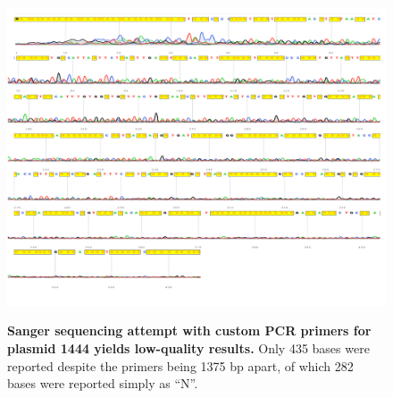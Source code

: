 \documentclass[withindex,glossary]{cam-thesis}
\begin{document}
\newpage{}

\begin{landscape}
\begin{figure}[htbp]
\centering
\includegraphics[width=0.76\linewidth]{figs/FigS5_SangerSequence.pdf}
\label{figS5}
\caption{\textbf{Sanger sequencing attempt with custom PCR primers for plasmid 1444 yields low-quality results.} Only 435 bases were reported despite the primers being 1375 bp apart, of which 282 bases were reported simply as ``N''. }
\end{figure}
\end{landscape}

\newpage{}

\makeatletter 
\renewcommand{\thetable}{S\@arabic\c@table}
\makeatother
\setcounter{table}{0}
\end{document}
